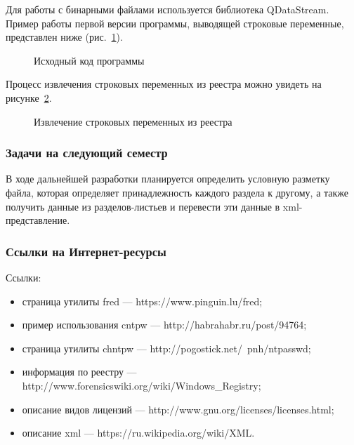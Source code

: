 Для работы с бинарными файлами используется библиотека QDataStream. Пример работы первой версии программы, выводящей строковые переменные, представлен ниже (рис.~\ref{source:source}).

\begin{figure}[ht!]                        %
\caption{Исходный код программы}
\label{source:source}
\end{figure}

Процесс извлечения строковых переменных из реестра можно увидеть на рисунке~\ref{izv:izv}.

\begin{figure}[ht!]                        %
\caption{Извлечение строковых переменных из реестра}
\label{izv:izv}
\end{figure}

\subsubsection{Задачи на следующий семестр}
В ходе дальнейшей разработки планируется определить условную разметку файла, которая определяет принадлежность каждого раздела к другому, а также получить данные из разделов-листьев и перевести эти данные в xml-представление.

\subsubsection{Ссылки на Интернет-ресурсы}
Ссылки:
\begin{itemize}
  \item страница утилиты fred --- https://www.pinguin.lu/fred;
  \item пример использования cntpw --- http://habrahabr.ru/post/94764;
  \item страница утилиты chntpw --- http://pogostick.net/~pnh/ntpasswd;
  \item информация по реестру --- http://www.forensicswiki.org/wiki/Windows\_Registry;
  \item описание видов лицензий --- http://www.gnu.org/licenses/licenses.html;
  \item описание xml --- https://ru.wikipedia.org/wiki/XML.
\end{itemize}

\clearpage
